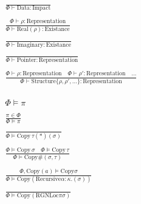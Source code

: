 \documentclass {article}
\begin{document}
\begin{gather*}
\\
\frac
{}
{\Phi \vdash \text{Data} : \text{Impact}} \\
\\
\frac
{\Phi \vdash \rho : \text{Representation}}
{\Phi \vdash \text{Real} (\rho) : \text{Existance}} \\
\\
\frac
{}
{\Phi \vdash \text{Imaginary} : \text{Existance}} \\
\\
\frac
{}
{\Phi \vdash \text{Pointer} : \text{Representation}} \\
\\
\frac
{\Phi \vdash \rho : \text{Representation} \quad \Phi \vdash \rho' : \text{Representation} \quad \dots}
{\Phi \vdash \text{Structure} \{ \rho, \rho', \dots \} : \text{Representation} } \\
\\
\\
\\
\Phi \models \pi \tag*{[Qualified Validation]} \\
\\
\frac
{\pi \in \Phi}
{\Phi \models \pi} \\
\\
\frac
{}
{\Phi \models \text{Copy} \, \tau(*)(\sigma)} \\
\\
\frac
{\Phi \models \text {Copy} \, \sigma \quad \Phi \models \text{Copy} \, \tau}
{\Phi \models \text{Copy} \#(\sigma, \tau) } \\
\\
\frac
{\Phi, \text{Copy}(a)  \models \text{Copy} \sigma }
{\Phi \models \text{Copy} (\text{Recursive} \alpha : \kappa. (\sigma)) } \\
\\
\frac
{}
{\Phi \models \text{Copy} (\text{RGNLoc} \pi \sigma)} \\
\end{gather*}
\end{document}
